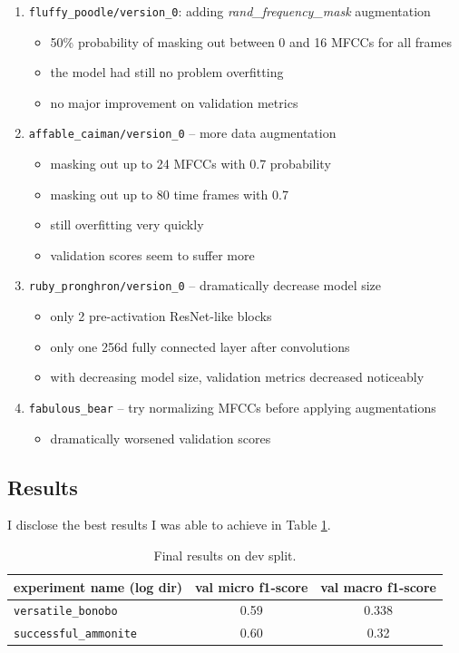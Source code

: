 \documentclass[11pt]{article}
\newcommand{\Log}[1]{{\small\texttt{#1}}}
\newcommand{\Fn}[1]{{\small\textit{#1}}}
\begin{document}
\begin{enumerate}
\begin{itemize}
    \end{itemize}
  \item \Log{fluffy\_poodle/version\_0}: adding \Fn{rand\_frequency\_mask} augmentation
    \begin{itemize}
      \item 50\% probability of masking out between 0 and 16 MFCCs for all frames
      \item the model had still no problem overfitting
      \item no major improvement on validation metrics
    \end{itemize}
  \item \Log{affable\_caiman/version\_0} -- more data augmentation
    \begin{itemize}
      \item masking out up to 24 MFCCs with 0.7 probability
      \item masking out up to 80 time frames with 0.7
      \item still overfitting very quickly
      \item validation scores seem to suffer more
    \end{itemize}
  \item \Log{ruby\_pronghron/version\_0} -- dramatically decrease model size
    \begin{itemize}
      \item only 2 pre-activation ResNet-like blocks
      \item only one 256d fully connected layer after convolutions
      \item with decreasing model size, validation metrics decreased noticeably
    \end{itemize}
  \item \Log{fabulous\_bear} -- try normalizing MFCCs before applying augmentations
    \begin{itemize}
      \item dramatically worsened validation scores
    \end{itemize}
\end{enumerate}

\subsection{Results}

I disclose the best results I was able to achieve in Table \ref{table:results}.

\begin{table}

  \centering
  \begin{tabular}{ l c c }
    \hline
    experiment name (log dir) & val micro f1-score & val macro f1-score \\
    \hline
    \Log{versatile\_bonobo} & 0.59 & 0.338 \\
    \Log{successful\_ammonite} & 0.60 & 0.32 \\
    \hline
  \end{tabular}


  \caption{Final results on dev split.}\label{table:results}
\end{table}
\end{document}
